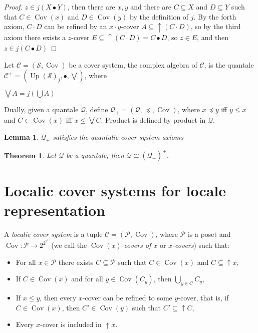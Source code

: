 \documentclass[a4paper]{article}
\theoremstyle{defin}
\theoremstyle{theorem}
\newtheorem{theorem}{Theorem}
\theoremstyle{claim}
\theoremstyle{prop}
\theoremstyle{lemma}
\newtheorem{lemma}{Lemma}
\theoremstyle{fact}
\theoremstyle{ex}
\theoremstyle{col}
\begin{document}
\begin{proof}
$z \in j (X \bullet Y)$, then there are $x, y$ and there are $C \subseteq X$ and $D \subseteq Y$ such that $C \in \operatorname{Cov}(x)$ and $D \in \operatorname{Cov}(y)$ by the definition of $j$. By the forth axiom, $C \cdot D$ can be refined by an $x \cdot y$-cover $A \subseteq \uparrow (C \cdot D)$, so by the third axiom there exists a $z$-cover $E \subseteq \uparrow (C \cdot D) = C \bullet D$, so $z \in E$, and then $z \in j (C \bullet D)$
\end{proof}

Let $\mathcal{C} = (\mathcal{S}, \operatorname{Cov})$ be a cover system, the complex algebra of $\mathcal{C}$, is the quantale $\mathcal{C}^{+} = (\operatorname{Up}(\mathcal{S})_j, \bullet, \bigvee)$, where
\begin{center}
$\bigvee A = j (\bigcup A)$
\end{center}

Dually, given a quantale $\mathcal{Q}$, define $\mathcal{Q}_+ = (\mathcal{Q}, \preceq, \operatorname{Cov})$, where
$x \preceq y$ iff $y \leq x$ and $C \in \operatorname{Cov}(x)$ iff $x \leq \bigvee C$. Product is defined by product in $\mathcal{Q}$.

\begin{lemma}
$\mathcal{Q}_+$ satisfies the quantalic cover system axioms
\end{lemma}

\begin{theorem}
Let $\mathcal{Q}$ be a quantale, then $\mathcal{Q} \cong (\mathcal{Q}_+)^+$.
\end{theorem}

\section{Localic cover systems for locale representation}

A \emph{localic cover system} is a tuple $\mathcal{C} = (\mathcal{P}, \operatorname{Cov})$, where $\mathcal{P}$ is a poset and $\operatorname{Cov} : \mathcal{P} \to 2^{2^{\mathcal{P}}}$ (we call the $\operatorname{Cov}(x)$ \emph{covers of $x$} or \emph{$x$-covers}) such that:
\begin{itemize}
\item For all $x \in \mathcal{P}$ there exists $C \subseteq \mathcal{P}$ such that $C \in \operatorname{Cov}(x)$ and $C \subseteq \uparrow x$,
\item If $C \in \operatorname{Cov}(x)$ and for all $y \in \operatorname{Cov}(C_y)$, then $\bigcup \limits_{y \in C} C_y$,
\item If $x \leq y$, then every $x$-cover can be refined to some $y$-cover, that is, if $C \in \operatorname{Cov}(x)$, then $C' \in \operatorname{Cov}(y)$ such that $C' \subseteq \uparrow C$,
\item Every $x$-cover is included in $\uparrow x$.
\end{itemize}
\end{document}

